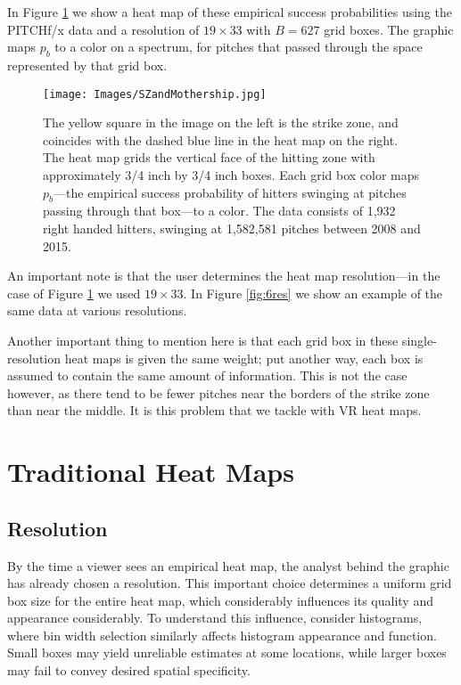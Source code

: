 In Figure \ref{fig:ms} we show a heat map of these empirical success probabilities using the PITCHf/x\textsuperscript{\textregistered} data and a resolution of $19 \times 33$ with $B = 627$ grid boxes. The graphic maps $p_{b}$ to a color on a spectrum, for pitches that passed through the space represented by that grid box.
  \begin{figure}[H]
	\centering
	\texttt{[image: Images/SZandMothership.jpg]} 
  \caption{The yellow square in the image on the left is the strike zone, and coincides with the dashed blue line in the heat map on the right. The heat map grids the vertical face of the hitting zone with approximately 3/4 inch by 3/4 inch boxes. Each grid box color maps $p_{b}$---the empirical success probability of hitters swinging at pitches passing through that box---to a color.  The data consists of 1,932 right handed hitters, swinging at 1,582,581 pitches between 2008 and 2015.}
  \label{fig:ms}
	\end{figure} 
An important note is that the user determines the heat map resolution---in the case of Figure \ref{fig:ms} we used $19 \times 33$. In Figure \ref{fig:6res} we show an example of the same data at various resolutions. 

Another important thing to mention here is that each grid box in these single-resolution heat maps is given the same weight; put another way, each box is assumed to contain the same amount of information. This is not the case however, as there tend to be fewer pitches near the borders of the strike zone than near the middle. It is this problem that we tackle with VR heat maps.

\section{Traditional Heat Maps} \label{THM}

\subsection{Resolution} %

By the time a viewer sees an empirical heat map, the analyst behind the graphic has already chosen a resolution. This important choice determines a uniform grid box size for the entire heat map, which considerably influences its quality and appearance considerably. To understand this influence, consider histograms, where bin width selection similarly affects histogram appearance and function. Small boxes may yield unreliable estimates at some locations, while larger boxes may fail to convey desired spatial specificity. 

